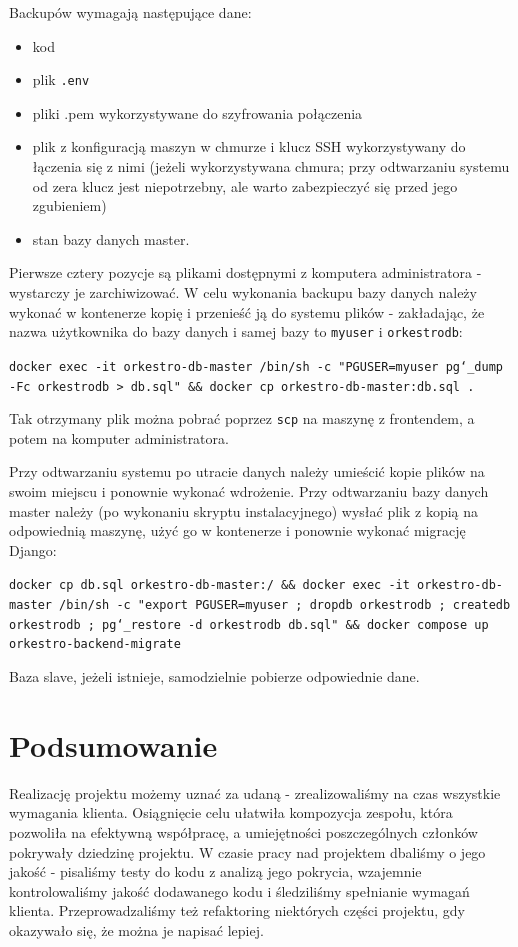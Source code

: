 \documentclass[11pt,a4paper]{article}
\renewcommand{\_}{\char`_}
\begin{document}
Backupów wymagają następujące dane:
\begin{itemize}
    \item kod
    \item plik \texttt{.env}
    \item pliki .pem  wykorzystywane do szyfrowania połączenia
    \item plik z konfiguracją maszyn w chmurze i klucz SSH wykorzystywany do łączenia się z nimi (jeżeli wykorzystywana chmura; przy odtwarzaniu systemu od zera klucz jest niepotrzebny, ale warto zabezpieczyć się przed jego zgubieniem)
    \item stan bazy danych master.
\end{itemize}

Pierwsze cztery pozycje są plikami dostępnymi z komputera administratora - wystarczy je  zarchiwizować. W celu wykonania backupu bazy danych należy wykonać w kontenerze kopię i przenieść ją do systemu plików - zakładając, że nazwa użytkownika do bazy danych i samej bazy to \texttt{myuser} i \texttt{orkestrodb}:

\texttt{docker exec -it orkestro-db-master /bin/sh -c "PGUSER=myuser pg\_dump -Fc orkestrodb > db.sql" \&\& docker cp orkestro-db-master:db.sql .}

Tak otrzymany plik można pobrać poprzez \texttt{scp} na maszynę z frontendem, a potem na komputer administratora. 

Przy odtwarzaniu systemu po utracie danych należy umieścić kopie plików na swoim miejscu i ponownie wykonać wdrożenie. Przy odtwarzaniu bazy danych master należy (po wykonaniu skryptu instalacyjnego) wysłać plik z kopią na odpowiednią maszynę, użyć go w kontenerze i ponownie wykonać migrację Django:

\texttt{docker cp db.sql orkestro-db-master:/ \&\& docker exec -it orkestro-db-master /bin/sh -c "export PGUSER=myuser ; dropdb orkestrodb ; createdb orkestrodb ; pg\_restore -d orkestrodb db.sql" \&\& docker compose up orkestro-backend-migrate}

Baza slave, jeżeli istnieje, samodzielnie pobierze odpowiednie dane.

\section{Podsumowanie}

Realizację projektu możemy uznać za udaną - zrealizowaliśmy na czas wszystkie wymagania klienta. Osiągnięcie celu ułatwiła kompozycja zespołu, która pozwoliła na efektywną współpracę, a umiejętności poszczególnych członków pokrywały dziedzinę projektu. W czasie pracy nad projektem dbaliśmy o jego jakość - pisaliśmy testy do kodu z analizą jego pokrycia, wzajemnie kontrolowaliśmy jakość dodawanego kodu i śledziliśmy spełnianie wymagań klienta. Przeprowadzaliśmy też refaktoring niektórych części projektu, gdy okazywało się, że można je napisać lepiej.
\end{document}
